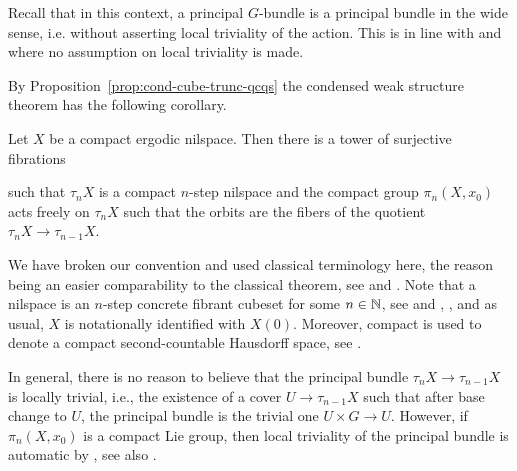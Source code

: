 \begin{remark}
Recall that in this context, a principal $G$-bundle is a principal bundle in the wide sense,
i.e. without asserting local triviality of the action.
This is in line with \cite[Definition 2.1.6]{Candela2017a} and \cite[Theorem 5.4]{Gutman2020}
where no assumption on local triviality is made.
\end{remark}

By Proposition~\ref{prop:cond-cube-trunc-qcqs} the condensed weak structure theorem has the following corollary.

\begin{corollary}\label{cor:compact-weak-structure}
Let $X$ be a compact ergodic nilspace.
Then there is a tower of surjective fibrations
\begin{center}
\end{center}
such that $\tau_n X$ is a compact $n$-step nilspace
and the compact group $\pi_n(X,x_0)$ acts freely on $\tau_n X$
such that the orbits are the fibers of the quotient $\tau_n X\to\tau_{n-1} X$.
\end{corollary}

We have broken our convention and used classical terminology here,
the reason being an easier comparability to the classical theorem,
see \cite[Theorem 5.4]{Gutman2020} and \cite[Proposition 2.1.9]{Candela2017a}.
Note that a nilspace is an $n$-step concrete fibrant cubeset for some $n\in{\mathbb{N}}$,
see \cite[Definition 3.6]{Gutman2020} and \cite[Definition 1.2.1]{Candela2017}, \cite[Definition 1.0.2]{Candela2017a},
and as usual, $X$ is notationally identified with $X(0)$.
Moreover, compact is used to denote a compact second-countable Hausdorff space, see \cite[Definition 1.0.1]{Candela2017a}.

\begin{remark}
In general, there is no reason to believe that the principal bundle $\tau_n X\to\tau_{n-1}X$ is locally trivial,
i.e., the existence of a cover $U\to \tau_{n-1}X$ such that after base change to $U$,
the principal bundle is the trivial one $U\times G\to U$.
However, if $\pi_n(X,x_0)$ is a compact Lie group, then local triviality of the principal bundle is automatic
by \cite[Theorem 3.3]{Gleason1950}, see also \cite[Proposition 2.5.2]{Candela2017a}.
\end{remark}
